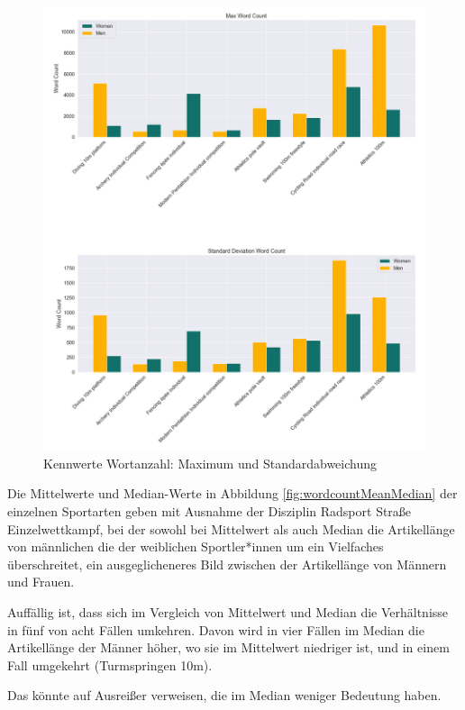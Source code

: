 \documentclass[11pt]{article}
\begin{document}
\begin{figure}
\includegraphics[width=1\textwidth]{figures/wordcount_max_std.png}
\caption[Kennwerte Wortanzahl: Maximum und Standardabweichung]{Kennwerte Wortanzahl: Maximum und Standardabweichung}
\label{fig:wordcountMaxStd}
\end{figure}

Die Mittelwerte und Median-Werte in Abbildung \ref{fig:wordcountMeanMedian} der einzelnen Sportarten geben mit Ausnahme der Disziplin Radsport Straße Einzelwettkampf, bei der sowohl bei Mittelwert als auch Median die Artikellänge von männlichen die der weiblichen Sportler*innen um ein Vielfaches überschreitet, ein ausgeglicheneres Bild zwischen der Artikellänge von Männern und Frauen.

Auffällig ist, dass sich im Vergleich von Mittelwert und Median die Verhältnisse in fünf von acht Fällen umkehren. Davon wird in vier Fällen im Median die Artikellänge der Männer höher, wo sie im Mittelwert niedriger ist, und in einem Fall umgekehrt (Turmspringen 10m).

Das könnte auf Ausreißer verweisen, die im Median weniger Bedeutung haben.
\end{document}
